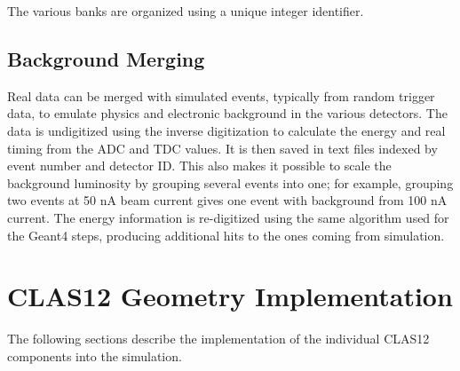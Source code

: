The various banks are organized using a unique integer identifier.

\subsection{Background Merging}

Real data can be merged with simulated events, typically from random trigger data, to emulate physics and electronic background in
the various detectors.
The data is un\-digitized using the inverse digitization to calculate the energy and real timing from the ADC and TDC values.
It is then saved in text files indexed by event number and detector ID. This also makes it possible to scale the background luminosity by grouping
several events into one; for example, grouping two events at 50 nA beam current gives one event with background from 100 nA current.
The energy information is re-digitized using the same algorithm used for the Geant4 steps, producing additional hits to the ones coming from simulation.


\section{CLAS12 Geometry Implementation}

The following sections describe the implementation of the individual CLAS12 components into the simulation.

